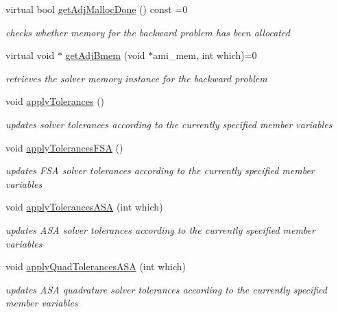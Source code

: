 \begin{DoxyCompactItemize}
virtual bool \mbox{\hyperlink{classamici_1_1_solver_a9673b3bc9248c4b7a156da9632b91436}{get\+Adj\+Malloc\+Done}} () const =0
\begin{DoxyCompactList}\small\item\em checks whether memory for the backward problem has been allocated \end{DoxyCompactList}\item 
virtual void $\ast$ \mbox{\hyperlink{classamici_1_1_solver_a96a36300db9c200d9586c2b90ced4195}{get\+Adj\+Bmem}} (void $\ast$ami\+\_\+mem, int which)=0
\begin{DoxyCompactList}\small\item\em retrieves the solver memory instance for the backward problem \end{DoxyCompactList}\item 
\mbox{\label{classamici_1_1_solver_a9819e5e5fa0d702721235eabd9e7c0e6}} 
void \mbox{\hyperlink{classamici_1_1_solver_a9819e5e5fa0d702721235eabd9e7c0e6}{apply\+Tolerances}} ()
\begin{DoxyCompactList}\small\item\em updates solver tolerances according to the currently specified member variables \end{DoxyCompactList}\item 
\mbox{\label{classamici_1_1_solver_a45ec22a0fddb6a8b37a3c3fdbdf7374f}} 
void \mbox{\hyperlink{classamici_1_1_solver_a45ec22a0fddb6a8b37a3c3fdbdf7374f}{apply\+Tolerances\+F\+SA}} ()
\begin{DoxyCompactList}\small\item\em updates F\+SA solver tolerances according to the currently specified member variables \end{DoxyCompactList}\item 
void \mbox{\hyperlink{classamici_1_1_solver_abdf8989d57153fde8988e73a98979297}{apply\+Tolerances\+A\+SA}} (int which)
\begin{DoxyCompactList}\small\item\em updates A\+SA solver tolerances according to the currently specified member variables \end{DoxyCompactList}\item 
void \mbox{\hyperlink{classamici_1_1_solver_a09d47957ba70f725efb5e3a385a274a6}{apply\+Quad\+Tolerances\+A\+SA}} (int which)
\begin{DoxyCompactList}\small\item\em updates A\+SA quadrature solver tolerances according to the currently specified member variables \end{DoxyCompactList}\item 

\end{DoxyCompactItemize}
